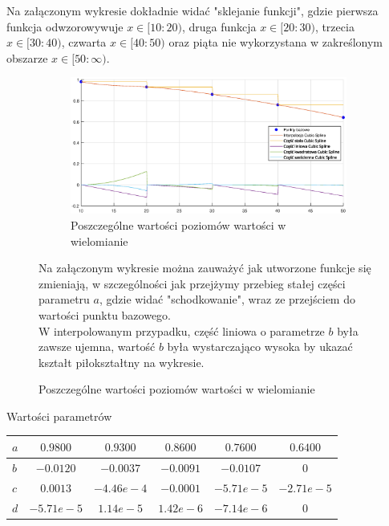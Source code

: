 \documentclass{article}
\begin{document}
Na załączonym wykresie dokładnie widać "sklejanie funkcji", gdzie pierwsza funkcja odwzorowywuje $x\in[10:20)$, druga funkcja $x\in[20:30)$, trzecia $x\in[30:40)$, czwarta $x\in[40:50)$ oraz piąta nie wykorzystana w zakreślonym obszarze $x\in[50:\infty)$.
\begin{figure}[H]
    \begin{multicols}{2}
        \begin{figure}[H]
            \centering
            \includegraphics[width=\linewidth, trim={2cm 0cm 1.4cm 0cm}]{newImg/CSsegments.eps}
        \caption{Poszczególne wartości poziomów wartości w wielomianie}
            \label{fig:my_label}
        \end{figure}
        \par
        \null \vfill
        Na załączonym wykresie można zauważyć jak utworzone funkcje się zmieniają, w szczególności jak przejżymy przebieg stałej części parametru $a$, gdzie widać "schodkowanie", wraz ze przejściem do wartości punktu bazowego.\\
        W interpolowanym przypadku, część liniowa o parametrze $b$ była zawsze ujemna, wartość $b$ była wystarczająco wysoka by ukazać kształt piłokształtny na wykresie.
        \vfill \null
    \end{multicols}
\end{figure}
Wartości parametrów
\begin{center}
    \begin{tabular}{|h|c|c|c|c|c|}
        \hline
        $a$ & $0.9800$ & $0.9300$ & $0.8600$ & $0.7600$ & $0.6400$ \\
        \hline
        $b$ & $-0.0120$ & $-0.0037$ & $-0.0091$ & $-0.0107$ & $0$\\
        \hline
        $c$ & $0.0013$ & $-4.46e-4$ & $-0.0001$ & $-5.71e-5$ & $-2.71e-5$ \\
        \hline
        $d$ & $-5.71e-5$ & $1.14e-5$ & $1.42e-6$ & $-7.14e-6$ & $0$\\
        \hline
    \end{tabular}
\end{center}
\end{document}
